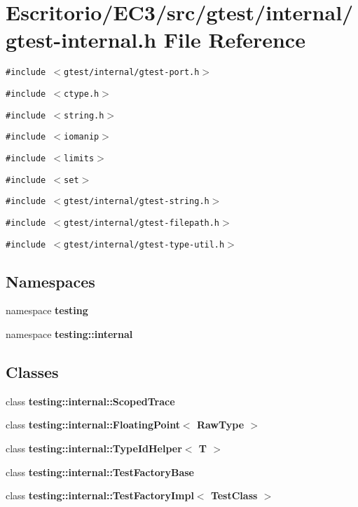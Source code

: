 \section{Escritorio/EC3/src/gtest/internal/gtest-internal.h File Reference}
\label{gtest-internal_8h}
{\tt \#include $<$gtest/internal/gtest-port.h$>$}\par
{\tt \#include $<$ctype.h$>$}\par
{\tt \#include $<$string.h$>$}\par
{\tt \#include $<$iomanip$>$}\par
{\tt \#include $<$limits$>$}\par
{\tt \#include $<$set$>$}\par
{\tt \#include $<$gtest/internal/gtest-string.h$>$}\par
{\tt \#include $<$gtest/internal/gtest-filepath.h$>$}\par
{\tt \#include $<$gtest/internal/gtest-type-util.h$>$}\par
\subsection*{Namespaces}
\begin{CompactItemize}
\item 
namespace {\bf testing}
\item 
namespace {\bf testing::internal}
\end{CompactItemize}
\subsection*{Classes}
\begin{CompactItemize}
\item 
class {\bf testing::internal::ScopedTrace}
\item 
class {\bf testing::internal::FloatingPoint$<$ RawType $>$}
\item 
class {\bf testing::internal::TypeIdHelper$<$ T $>$}
\item 
class {\bf testing::internal::TestFactoryBase}
\item 
class {\bf testing::internal::TestFactoryImpl$<$ TestClass $>$}
\end{CompactItemize}
